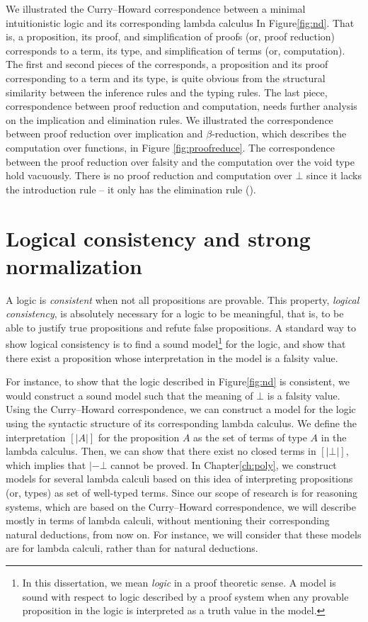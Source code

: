 We illustrated the Curry--Howard correspondence between
a minimal intuitionistic logic and its corresponding lambda calculus
In Figure\;\ref{fig:nd}. That is, a proposition, its proof, and
simplification of proofs (or, proof reduction) corresponds to
a term, its type, and simplification of terms (or, computation).
The first and second pieces of the corresponds, a proposition and
its proof corresponding to a term and its type, is quite obvious from
the structural similarity between the inference rules and the typing rules.
The last piece, correspondence between proof reduction and computation,
needs further analysis on the implication and elimination rules.
We illustrated the correspondence between proof reduction over implication
and $\beta$-reduction, which describes the computation over functions,
in Figure \ref{fig:proofreduce}. The correspondence between
the proof reduction over falsity and the computation over the void type
hold vacuously. There is no proof reduction and computation over $\bot$
since it lacks the introduction rule -- it only has the elimination rule
().

\section{Logical consistency and strong normalization}
A logic is \emph{consistent} when not all propositions are provable.
This property, \emph{logical consistency}, is absolutely necessary for
a logic to be meaningful, that is, to be able to justify true propositions
and refute false propositions. A standard way to show logical consistency
is to find a sound model\footnote{In this dissertation, we mean \emph{logic}
	in a proof theoretic sense. A model is sound with respect to logic
	described by a proof system when any provable proposition
	in the logic is interpreted as a truth value in the model.}
for the logic, and show that there exist a proposition whose interpretation
in the model is a falsity value.

For instance, to show that the logic described in Figure\;\ref{fig:nd}
is consistent, we would construct a sound model such that the meaning of
$\bot$ is a falsity value. Using the Curry--Howard correspondence,
we can construct a model for the logic using the syntactic structure of its
corresponding lambda calculus. We define the interpretation $[|A|]$ for
the proposition $A$ as the set of terms of type $A$ in the lambda calculus.
Then, we can show that there exist no closed terms in $[|\bot|]$,
which implies that $|- \bot$ cannot be proved. In Chapter\;\ref{ch:poly},
we construct models for several lambda calculi based on this idea of
interpreting propositions (or, types) as set of well-typed terms.
Since our scope of research is for reasoning systems, which are based on
the Curry--Howard correspondence, we will describe mostly in terms of
lambda calculi, without mentioning their corresponding natural deductions,
from now on. For instance, we will consider that these models are for
lambda calculi, rather than for natural deductions.

